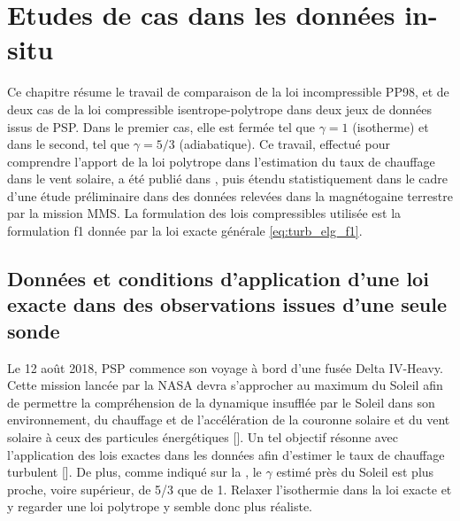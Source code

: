 \chapter{Etudes de cas dans les données in-situ }
\renewcommand\partie{\Partie\ Chapitre \thechapter}
\label{ch-14}

\minitoc  

\bigskip

Ce chapitre résume le travail de comparaison de la loi incompressible \acs{PP98}, et de deux cas de la loi compressible isentrope-polytrope dans deux jeux de données issus de \ac{PSP}. Dans le premier cas, elle est fermée tel que $\gamma = 1$ (isotherme) et dans le second, tel que $\gamma = 5/3$ (adiabatique). Ce travail, effectué pour comprendre l'apport de la loi polytrope dans l'estimation du taux de chauffage dans le vent solaire, a été publié dans \cite{simon_general_2021}, puis étendu statistiquement dans le cadre d'une étude préliminaire dans des données relevées dans la magnétogaine terrestre par la mission \ac{MMS}. La formulation des lois compressibles utilisée est la formulation f1 donnée par la loi exacte générale \eqref{eq:turb_elg_f1}. 

\section{Données et conditions d'application d'une loi exacte dans des observations issues d'une seule sonde}
\label{sec-141}

Le 12 août 2018, \ac{PSP} commence son voyage à bord d'une fusée Delta IV-Heavy. Cette mission lancée par la \ac{NASA} devra s'approcher au maximum du Soleil afin de permettre la compréhension de la dynamique insufflée par le Soleil dans son environnement, du chauffage et de l'accélération de la couronne solaire et du vent solaire à ceux des particules énergétiques [\cite{fox_solar_2016}]. Un tel objectif résonne avec l'application des lois exactes dans les données afin d'estimer le taux de chauffage turbulent [\cite{parashar_observations_2022}]. De plus, comme indiqué sur la , le $\gamma$ estimé près du Soleil est plus proche, voire supérieur, de 5/3 que de 1. Relaxer l'isothermie dans la loi exacte et y regarder une loi polytrope y semble donc plus réaliste. 

